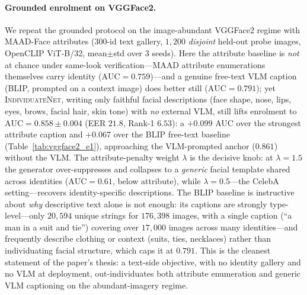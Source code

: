 \documentclass[10pt,twocolumn,letterpaper]{article}
\newcommand{\method}{\textsc{IndividuateNet}}
\begin{document}
\paragraph{Grounded enrolment on VGGFace2.}
We repeat the grounded protocol on the image-abundant VGGFace2 regime with MAAD-Face
attributes (300-id text gallery, $1{,}200$ \emph{disjoint} held-out probe images, OpenCLIP
ViT-B/32, mean$\pm$std over 3 seeds). Here the attribute baseline is \emph{not} at chance under same-look
verification---MAAD attribute enumerations themselves carry identity ($\mathrm{AUC}=0.759$)---and a
genuine free-text VLM caption (BLIP, prompted on a context image) does better still
($\mathrm{AUC}=0.791$); yet
\method{}, writing only faithful facial descriptions (face shape, nose, lips, eyes, brows,
facial hair, skin tone) with \emph{no} external VLM, still lifts enrolment to
$\mathrm{AUC}=0.858{\pm}0.004$ (EER $21.8$, Rank-1 $6.53$): a $+0.099$ AUC over the strongest
attribute caption and $+0.067$ over the BLIP free-text baseline
(Table~\ref{tab:vggface2_e1}), approaching the
VLM-prompted anchor ($0.861$) without the VLM. The attribute-penalty weight $\lambda$ is the
decisive knob: at $\lambda=1.5$ the generator over-suppresses and collapses to a
\emph{generic} facial template shared across identities ($\mathrm{AUC}=0.61$, below attribute),
while $\lambda=0.5$---the CelebA setting---recovers identity-specific descriptions. The BLIP
baseline is instructive about \emph{why} descriptive text alone is not enough: its captions are
strongly type-level---only $20{,}594$ unique strings for $176{,}398$ images, with a single
caption (``a man in a suit and tie'') covering over $17{,}000$ images across many
identities---and frequently describe clothing or context (suits, ties, necklaces) rather than
individuating facial structure, which caps it at $0.791$. This is the
cleanest statement of the paper's thesis: a text-side objective, with no identity gallery and
no VLM at deployment, out-individuates both attribute enumeration and generic VLM captioning on
the abundant-imagery regime.
\end{document}
